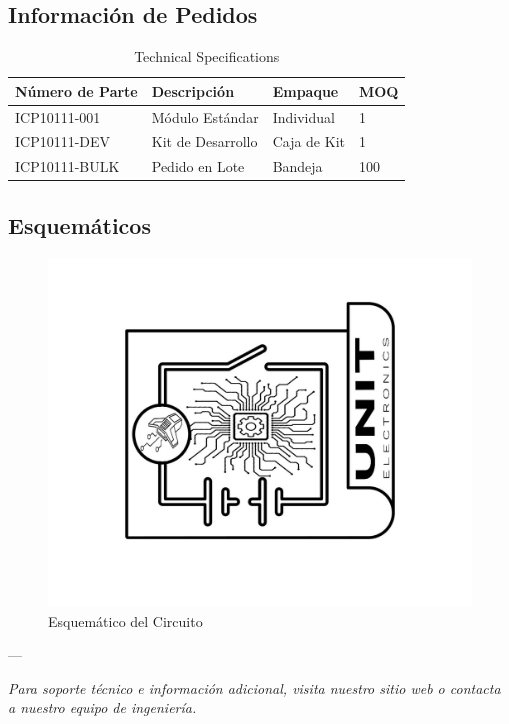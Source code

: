 \documentclass[11pt,a4paper]{article}
\begin{document}
\subsection{Información de Pedidos}


\begin{table}[H]
\centering
\small
\begin{tabular}{|l|l|l|l|}
\hline
Número de Parte & Descripción & Empaque & MOQ \\
\hline
ICP10111-001 & Módulo Estándar & Individual & 1 \\
ICP10111-DEV & Kit de Desarrollo & Caja de Kit & 1 \\
ICP10111-BULK & Pedido en Lote & Bandeja & 100 \\
\hline
\end{tabular}
\caption{Technical Specifications}
\end{table}


\subsection{Esquemáticos}


\begin{figure}[H]
\centering
\includegraphics[width=\textwidth]{es_Schematics_icon.jpg}
\caption{Esquemático del Circuito}
\label{fig:es-Schematics-icon-jpg}
\end{figure}



---

\textit{Para soporte técnico e información adicional, visita nuestro sitio web o contacta a nuestro equipo de ingeniería.}
\end{document}
